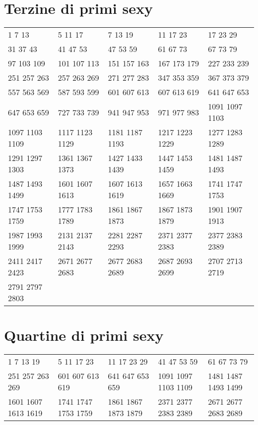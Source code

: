 \section{Terzine di primi sexy}
\begin{center}
 \footnotesize
 \begin{tabular}{*{5}{l}}
  \toprule 
1 7 13 & 5 11 17 & 7 13 19 & 11 17 23 & 17 23 29\\
31 37 43 & 41 47 53 & 47 53 59 & 61 67 73 & 67 73 79\\
97 103 109 & 101 107 113 & 151 157 163 & 167 173 179 & 227 233 239\\
251 257 263 & 257 263 269 & 271 277 283 & 347 353 359 & 367 373 379\\
557 563 569 & 587 593 599 & 601 607 613 & 607 613 619 & 641 647 653\\
647 653 659 & 727 733 739 & 941 947 953 & 971 977 983 & 1091 1097 1103\\
1097 1103 1109 & 1117 1123 1129 & 1181 1187 1193 & 1217 1223 1229 & 1277 1283 1289\\
1291 1297 1303 & 1361 1367 1373 & 1427 1433 1439 & 1447 1453 1459 & 1481 1487 1493\\
1487 1493 1499 & 1601 1607 1613 & 1607 1613 1619 & 1657 1663 1669 & 1741 1747 1753\\
1747 1753 1759 & 1777 1783 1789 & 1861 1867 1873 & 1867 1873 1879 & 1901 1907 1913\\
1987 1993 1999 & 2131 2137 2143 & 2281 2287 2293 & 2371 2377 2383 & 2377 2383 2389\\
2411 2417 2423 & 2671 2677 2683 & 2677 2683 2689 & 2687 2693 2699 & 2707 2713 2719\\
2791 2797 2803 \\  
  \bottomrule
 \end{tabular}
\end{center}
\section{Quartine di primi sexy}
\begin{center}
 \footnotesize
 \begin{tabular}{*{5}{l}}
  \toprule 
1 7 13 19 & 5 11 17 23 & 11 17 23 29 & 41 47 53 59 & 61 67 73 79 \\
251 257 263 269 & 601 607 613 619 & 641 647 653 659 & 1091 1097 1103 1109 & 1481 1487 1493 1499 \\
1601 1607 1613 1619 & 1741 1747 1753 1759 & 1861 1867 1873 1879 & 2371 2377 2383 2389 & 2671 2677 2683 2689 \\ 
  \bottomrule
 \end{tabular}
\end{center}

